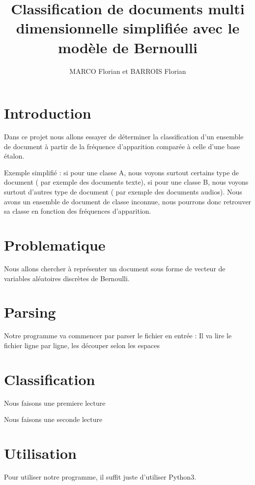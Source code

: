 \documentclass[a4paper,11pt]{article}
\title{Classification de documents multi dimensionnelle simplifiée avec le modèle de Bernoulli}
\author{MARCO Florian et BARROIS Florian}
\date{}
\begin{document}
\maketitle

\section{Introduction}

Dans ce projet nous allons essayer de déterminer la classification d'un ensemble de document à partir de la fréquence d'apparition comparée à celle d'une base étalon.

Exemple simplifié : si pour une classe A, nous voyons surtout certains type de document ( par exemple des documents texte), si pour une classe B, nous voyons surtout d'autres type de document ( par exemple des documents audios). 
Nous avons un ensemble de document de classe inconnue, nous pourrons donc retrouver sa classe en fonction des fréquences d'apparition.

\section{Problematique}

Nous allons chercher à représenter un document sous forme de vecteur de variables aléatoires discrètes de Bernoulli. 

\section{Parsing}

Notre programme va commencer par parser le fichier en entrée :
Il va lire le fichier ligne par ligne, les découper selon les espaces 

\section{Classification}

Nous faisons une premiere lecture

Nous faisons une seconde lecture

\section{Utilisation}

Pour utiliser notre programme, il suffit juste d'utiliser Python3.
\end{document}
